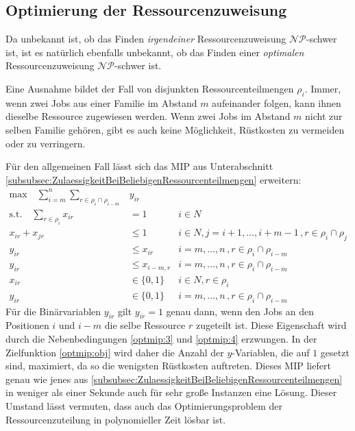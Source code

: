 \documentclass{scrreprt}
\begin{document}
\subsection{Optimierung der Ressourcenzuweisung}
\label{subsec:OptimierungDerRessourcenzuweisung}
Da unbekannt ist, ob das Finden \textit{irgendeiner} Ressourcenzuweisung $\mathcal{NP}$-schwer ist,
ist es natürlich ebenfalls unbekannt, ob das Finden einer \textit{optimalen} Ressourcenzuweisung $\mathcal{NP}$-schwer ist.

Eine Ausnahme bildet der Fall von disjunkten Ressourcenteilmengen $\rho_i$.
Immer, wenn zwei Jobs aus einer Familie im Abstand $m$ aufeinander folgen, kann ihnen dieselbe Ressource zugewiesen werden.
Wenn zwei Jobs im Abstand $m$ nicht zur selben Familie gehören, gibt es auch keine Möglichkeit, Rüstkosten zu vermeiden oder zu verringern.

Für den allgemeinen Fall lässt sich das MIP aus Unterabschnitt \ref{subsubsec:ZulaessigkeitBeiBeliebigenRessourcenteilmengen} erweitern:
\begin{align}
    \text{max} \quad \sum_{i=m}^n\sum_{r\in\rho_i\cap\rho_{i-m}} &y_{ir} \label{optmip:obj} \\
    \text{s.t.}\quad \sum_{r\in\rho_i} x_{ir} &= 1 & i\in N \label{optmip:1} \\
    x_{ir} + x_{jr} &\leq 1 & i\in N, j=i+1,\ldots,i+m-1 \, ,r\in\rho_i\cap\rho_j \label{optmip:2} \\
    y_{ir} &\leq x_{ir} & i=m,\ldots,n \, ,r\in\rho_i\cap\rho_{i-m} \label{optmip:3}\\
    y_{ir} &\leq x_{i-m,r} & i=m,\ldots,n \, ,r\in\rho_i\cap\rho_{i-m} \label{optmip:4}\\
    x_{ir} &\in \{0,1\} & i\in N, r\in\rho_i \\
    y_{ir} &\in \{0,1\} & i=m,\ldots,n \, ,r\in\rho_i\cap\rho_{i-m}
\end{align}
Für die Binärvariablen $y_{ir}$ gilt $y_{ir}=1$ genau dann, wenn den Jobs an den Positionen $i$ und $i-m$ die selbe Ressource $r$ zugeteilt ist.
Diese Eigenschaft wird durch die Nebenbedingungen \ref{optmip:3} und \ref{optmip:4} erzwungen.
In der Zielfunktion \ref{optmip:obj} wird daher die Anzahl der $y$-Variablen, die auf $1$ gesetzt sind, maximiert, da so die wenigsten Rüstkosten auftreten.
Dieses MIP liefert genau wie jenes aus \ref{subsubsec:ZulaessigkeitBeiBeliebigenRessourcenteilmengen} in weniger als einer Sekunde auch für sehr große Instanzen eine Lösung.
Dieser Umstand lässt vermuten, dass auch das Optimierungsproblem der Ressourcenzuteilung in polynomieller Zeit lösbar ist.
\end{document}
